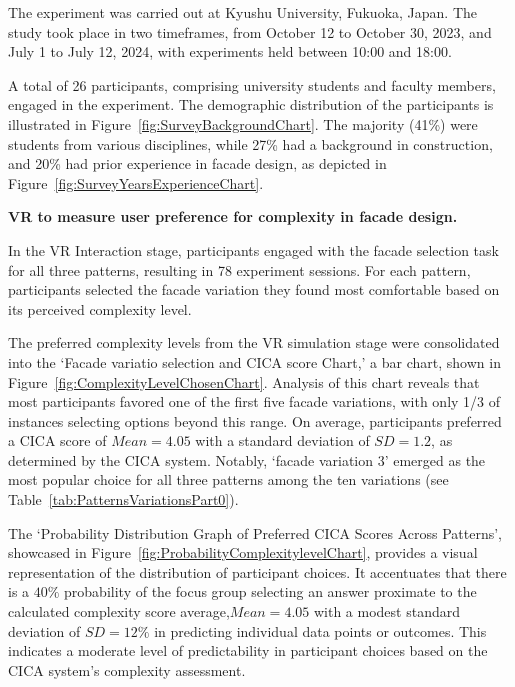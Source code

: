 
The experiment was carried out at Kyushu University, Fukuoka, Japan.
The study took place in two timeframes, from October 12 to October 30, 2023, and July 1 to July 12, 2024, with experiments held between 10:00 and 18:00.

A total of 26 participants, comprising university students and faculty members, engaged in the experiment.
The demographic distribution of the participants is illustrated in Figure~\ref{fig:SurveyBackgroundChart}.
The majority (41\%) were students from various disciplines, while 27\% had a background in construction, and 20\% had prior experience in facade design, as depicted in Figure~\ref{fig:SurveyYearsExperienceChart}.

\textbf{VR to measure user preference for complexity in facade design.}

In the VR Interaction stage, participants engaged with the facade selection task for all three patterns, resulting in 78 experiment sessions.
For each pattern, participants selected the facade variation they found most comfortable based on its perceived complexity level.


The preferred complexity levels from the VR simulation stage were consolidated into the `Facade variatio selection and CICA score Chart,' a bar chart, shown in Figure~\ref{fig:ComplexityLevelChosenChart}.
Analysis of this chart reveals that most participants favored one of the first five facade variations, with only 1/3 of instances selecting options beyond this range.
On average, participants preferred a CICA score of \(Mean = 4.05\) with a standard deviation of \(SD = 1.2\), as determined by the CICA system.
Notably, `facade variation 3'  emerged as the most popular choice for all three patterns among the ten variations (see Table~\ref{tab:PatternsVariationsPart0}).


The `Probability Distribution Graph of Preferred CICA Scores Across Patterns', showcased in Figure~\ref{fig:ProbabilityComplexitylevelChart}, provides a visual representation of the distribution of participant choices.
It accentuates that there is a \(40\%\) probability of the focus group selecting an answer proximate to the calculated complexity score average,\(Mean = 4.05\) with a modest standard deviation of \(SD = 12\%\) in predicting individual data points or outcomes.
 This indicates a moderate level of predictability in participant choices based on the CICA system's complexity assessment.


